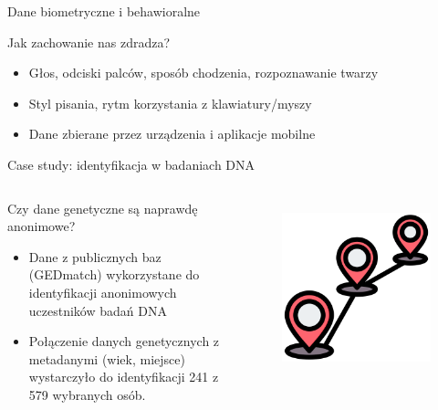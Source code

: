   
  \begin{frame}{Dane biometryczne i behawioralne}
    \begin{alertblock}{Jak zachowanie nas zdradza?}
      \begin{itemize}
        \item Głos, odciski palców, sposób chodzenia, rozpoznawanie twarzy
        \item Styl pisania, rytm korzystania z klawiatury/myszy
        \item Dane zbierane przez urządzenia i aplikacje mobilne
      \end{itemize}
    \end{alertblock}
  \end{frame}
  
  
  \begin{frame}{Case study: identyfikacja w badaniach DNA}
  \begin{columns}[c]
      \begin{alertblock}{Czy dane genetyczne są naprawdę anonimowe?}
        \begin{itemize}
          \item Dane z publicznych baz (GEDmatch) wykorzystane do identyfikacji anonimowych uczestników badań DNA
          \item Połączenie danych genetycznych z metadanymi (wiek, miejsce) wystarczyło do identyfikacji 241 z 579 wybranych osób.\cite{DNA_LEAK}
        \end{itemize}
      \end{alertblock}
      \begin{figure}
        \centering
        \includegraphics[height=0.45\textheight]{images/routing.png}
        \label{fig:dnaCase}
      \end{figure}
  \end{columns}
  \end{frame}